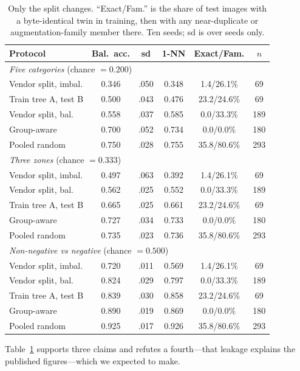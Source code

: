 \documentclass[conference,10pt]{IEEEtran}
\begin{document}
\begin{table}[t]
\caption{Only the split changes. ``Exact/Fam.'' is the share of test images with
a byte-identical twin in training, then with any near-duplicate or
augmentation-family member there. Ten seeds; sd is over seeds only.}
\label{tab:ablation}
\centering
\setlength{\tabcolsep}{2.5pt}
\begin{tabular}{lccccc}
\toprule
Protocol & Bal.\ acc. & sd & 1-NN & Exact/Fam. & $n$\\
\midrule
\multicolumn{6}{l}{\emph{Five categories} (chance $=0.200$)}\\
Vendor split, imbal. & 0.346 & .050 & 0.348 & 1.4/26.1\% & 69\\
Train tree A, test B & 0.500 & .043 & 0.476 & 23.2/24.6\% & 69\\
Vendor split, bal. & 0.558 & .037 & 0.585 & 0.0/33.3\% & 189\\
Group-aware & 0.700 & .052 & 0.734 & 0.0/0.0\% & 180\\
Pooled random & 0.750 & .028 & 0.755 & 35.8/80.6\% & 293\\
\midrule
\multicolumn{6}{l}{\emph{Three zones} (chance $=0.333$)}\\
Vendor split, imbal. & 0.497 & .063 & 0.392 & 1.4/26.1\% & 69\\
Vendor split, bal. & 0.562 & .025 & 0.552 & 0.0/33.3\% & 189\\
Train tree A, test B & 0.665 & .025 & 0.661 & 23.2/24.6\% & 69\\
Group-aware & 0.727 & .034 & 0.733 & 0.0/0.0\% & 180\\
Pooled random & 0.735 & .023 & 0.736 & 35.8/80.6\% & 293\\
\midrule
\multicolumn{6}{l}{\emph{Non-negative vs negative} (chance $=0.500$)}\\
Vendor split, imbal. & 0.720 & .011 & 0.569 & 1.4/26.1\% & 69\\
Vendor split, bal. & 0.824 & .029 & 0.797 & 0.0/33.3\% & 189\\
Train tree A, test B & 0.839 & .030 & 0.858 & 23.2/24.6\% & 69\\
Group-aware & 0.890 & .019 & 0.869 & 0.0/0.0\% & 180\\
Pooled random & 0.925 & .017 & 0.926 & 35.8/80.6\% & 293\\
\bottomrule
\end{tabular}
\end{table}


Table~\ref{tab:ablation} supports three claims and refutes a fourth---that
leakage explains the published figures---which we expected to make.
\end{document}
